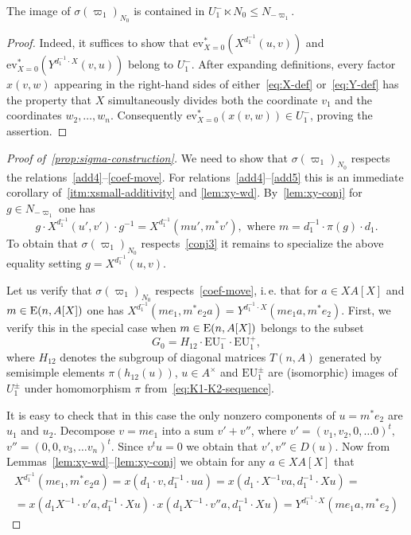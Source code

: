 \begin{lemma}\label{lem:sigma-N0-image}
    The image of $\sigma(\varpi_1)_{N_0}$ is contained in $U_1^- \ltimes N_0 \leq N_{-\varpi_1}$.
\end{lemma}
\begin{proof}
Indeed, it suffices to show that $\mathrm{ev}_{X=0}^*(X^{d_1^{-1}}(u, v))$ and $\mathrm{ev}_{X=0}^*(Y^{d^{-1}_1 \cdot X}(v, u))$ belong to $U_1^-$.
After expanding definitions, every factor $x(v, w)$ appearing in the right-hand sides of either~\eqref{eq:X-def} or~\eqref{eq:Y-def}
 has the property that $X$ simultaneously divides both the coordinate $v_1$ and the coordinates $w_2, \ldots, w_n$.
Consequently $\mathrm{ev}_{X=0}^* \left(x(v, w)\right) \in U_1^-$, proving the assertion.
\end{proof}

\begin{proof}[Proof of~\cref{prop:sigma-construction}]
    We need to show that $\sigma(\varpi_1)_{N_0}$ respects the relations~\eqref{add4}--\eqref{coef-move}.
    For relations~\eqref{add4}--\eqref{add5} this is an immediate corollary of~\cref{itm:xsmall-additivity} and \cref{lem:xy-wd}.
    By~\cref{lem:xy-conj} for $g \in N_{-\varpi_1}$ one has
    \begin{equation}
        \label{eq:xy-conj-n1}
        g \cdot X^{d_1^{-1}}(u', v') \cdot g^{-1} = X^{d_1^{-1}}(mu', m^*v'), \text{ where } m = d_1^{-1} \cdot \pi(g) \cdot d_1.
    \end{equation}
    To obtain that $\sigma(\varpi_1)_{N_0}$ respects~\eqref{conj3} it remains to specialize the above equality setting $g = X^{d_1^{-1}}(u, v)$.

    Let us verify that $\sigma(\varpi_1)_{N_0}$ respects~\eqref{coef-move}, i.\,e. that for $a\in XA[X]$ and $m \in \operatorname{E}(n, A[X])$ one has
    $X^{d_1^{-1}}(me_1, m^*e_2 a) = Y^{d_1^{-1} \cdot X}(me_1 a, m^* e_2)$.
    First, we verify this in the special case when $m \in \operatorname{E}(n, A[X])$ belongs to the subset
    \[G_0 = H_{12} \cdot \mathrm{EU}^-_1 \cdot \mathrm{EU}^+_1,\]
    where $H_{12}$ denotes the subgroup of diagonal matrices $T(n, A)$ generated by semisimple elements $\pi(h_{12}(u))$, $u \in A^\times$
     and $\mathrm{EU}^\pm_1$ are (isomorphic) images of $U^\pm_1$ under homomorphism $\pi$ from~\eqref{eq:K1-K2-sequence}.

    It is easy to check that in this case the only nonzero components of $u = m^* e_2$ are $u_1$ and $u_2$.
    Decompose $v = m e_1$ into a sum $v' + v''$, where $v' = (v_1, v_2, 0, \ldots 0)^t,$ $v'' = (0, 0, v_3, \ldots v_n)^t$.
    Since $v^t u = 0$ we obtain that $v', v'' \in D(u)$.
    Now from Lemmas~\ref{lem:xy-wd}--\ref{lem:xy-conj} we obtain for any $a \in XA[X]$ that
    \begin{multline}
        \label{eq:special-case}
        X^{d_1^{-1}}(me_1, m^*e_2 a) =
        x(d_1 \cdot v, d_{1}^{-1} \cdot u a) =
        x(d_1 \cdot X^{-1} va, d_1^{-1} \cdot X u) = \\
        = x(d_1 X^{-1} \cdot v'a, d_1^{-1}\cdot X u) \cdot x(d_1 X^{-1}\cdot v''a, d_1^{-1} \cdot X u) =
        Y^{d_1^{-1} \cdot X}(me_{1}a, m^* e_2)
    \end{multline}


\end{proof}
